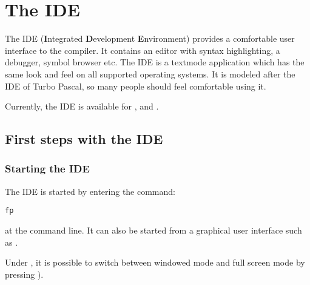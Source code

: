 %
%
%
%
%
\chapter{The IDE}

The IDE (\textbf{I}ntegrated \textbf{D}evelopment \textbf{E}nvironment)
provides a comfortable user interface to the compiler. It contains an 
editor with syntax highlighting, a debugger, symbol browser etc. 
The IDE is a textmode application which has the same look and feel 
on all supported operating systems. It is modeled after the IDE of Turbo
Pascal, so many people should feel comfortable using it.

Currently, the IDE is available for \dos, \windows and \linux.

\section{First steps with the IDE}
%
%
\subsection{Starting the IDE}
The IDE is started by entering the command:
\begin{verbatim}
fp
\end{verbatim}
at the command line. It can also be started from a graphical user 
interface such as \windows. 
\begin{remark}
Under \windows, it is possible to switch between windowed mode and 
full screen mode by pressing ).
\end{remark}
%
%
